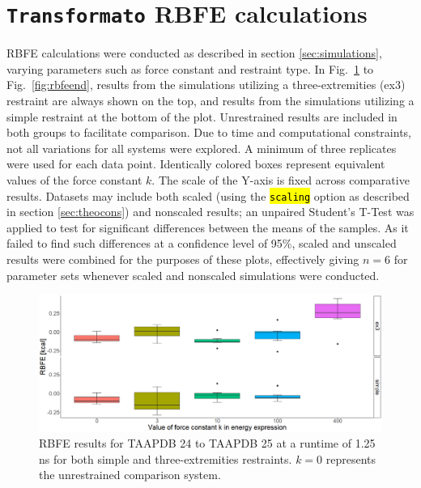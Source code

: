 \documentclass[oneside]{scrreprt}
\newcommand{\code}[1]{\texttt{\hl{#1}}}
\begin{document}
\section{\texttt{Transformato} RBFE calculations}\label{sec:results_tf_rbfe}
RBFE calculations were conducted as described in section \ref{sec:simulations}, varying parameters such as force constant and restraint type. In Fig.~\ref{fig:rbfestart} to Fig.~\ref{fig:rbfeend}, results from the simulations utilizing a three-extremities (ex3) restraint are always shown on the top, and results from the simulations utilizing a simple restraint at the bottom of the plot. Unrestrained results are included in both groups to facilitate comparison. Due to time and computational constraints, not all variations for all systems were explored. A minimum of three replicates were used for each data point. Identically colored boxes represent equivalent values of the force constant $k$. The scale of the Y-axis is fixed across comparative results. Datasets may include both scaled (using the \code{scaling} option as described in section \ref{sec:theocons}) and nonscaled results; an unpaired Student's T-Test \cite{luroth_vergleichung_1876} was applied to test for significant differences between the means of the samples. As it failed to find such differences at a confidence level of 95\%, scaled and unscaled results were combined for the purposes of these plots, effectively giving $n=6$ for parameter sets whenever scaled and nonscaled simulations were conducted.


\begin{figure}[h]
    \centering
    \includegraphics[width=1\textwidth]{plots/boxplot_rbfe_taapdb_1.25ns.png}
    \caption[RBFE results for TAAPDB 24 to 25]{RBFE results for TAAPDB 24 to TAAPDB 25 at a runtime of 1.25 ns for both simple and three-extremities restraints. $k=0$ represents the unrestrained comparison system.}
    \label{fig:rbfestart}
    
\end{figure}
\end{document}
